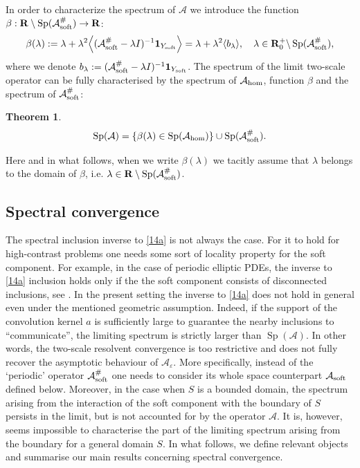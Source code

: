 \documentclass[11pt]{article}
\renewcommand{\b}{\beta}
\newcommand\e {\varepsilon}
\newcommand\soft{{\rm soft}}
\newcommand{\R}{\mathbf{R}}
\def\AA{\mathcal{A}}
\def\l{\lambda}
\def\hom{{\rm hom}}
\DeclareMathOperator{\Sp}{Sp}
\def\b{\beta}
\newtheorem{theorem}{Theorem}[section]
\theoremstyle{remark}
\begin{document}
In order to characterize the spectrum of $\AA$ we introduce the function $\beta: \R\setminus \Sp (\AA_\soft^\# ) \to \R$:
\begin{equation} \label{ruc22}
	\beta(\lambda):= \lambda+\lambda^2 \Big\langle (\AA_\soft^\# -\l I)^{-1}  \mathbf{1}_{Y_\soft }\Big\rangle = \lambda+\lambda^2 \langle b_\l \rangle, \quad \l \in \mathbf{R}^+_0 \backslash \Sp (\AA_\soft^\# ),
\end{equation} 	
where we denote $b_\l:=(\AA_\soft^\# -\l I)^{-1}  \mathbf{1}_{Y_\soft }$.
The spectrum of the limit two-scale operator can be fully characterised by the spectrum of $\AA_\hom$, function $\beta$ and the spectrum of $\AA_\soft^\# $:
\begin{theorem}\label{thm2.3}
	\begin{equation}\label{57}
		\Sp (\AA)= \{\beta(\l) \in \Sp (\AA_\hom)\}\cup \Sp  (\AA_\soft^\# )  .
	\end{equation} 	
\end{theorem} 	

Here and in what follows, when we write $\b(\l)$ we tacitly assume that $\l$ belongs to the domain of $\b$, i.e. $\l \in \R\setminus \Sp (\AA_\soft^\# )$.



\subsection{Spectral convergence} \label{s2.2}

The spectral inclusion inverse to \eqref{14a} is not always the case. For it to hold for high-contrast problems one needs some sort of locality property for the soft component. For example, in the case of periodic elliptic PDEs, the inverse to \eqref{14a} inclusion holds only if the the soft component consists of disconnected inclusions, see \cite{Zhikov2004}. In the present setting the inverse to \eqref{14a} does not hold in general even under the mentioned geometric assumption. Indeed, if the support of the convolution kernel $a$ is sufficiently large to guarantee the nearby inclusions to ``communicate'', the limiting spectrum is strictly larger than $\Sp(\AA)$. In other words, the two-scale resolvent convergence is too restrictive and does not fully recover the asymptotic behaviour of $\AA_\e$. More specifically, instead of the `periodic' operator $\AA_\soft^\#$ one needs to consider its whole space counterpart $\AA_\soft$ defined below. Moreover, in the case when $S$ is a bounded domain, the spectrum arising from the interaction of the soft component with the boundary of $S$ persists in the limit, but is not accounted for by the operator $\AA$. It is, however, seems impossible to characterise the part of the limiting spectrum arising from the boundary for a general domain $S$.  In what follows, we define relevant objects and summarise our main results concerning spectral convergence.
\end{document}
